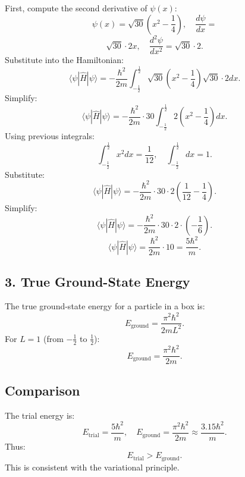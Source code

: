 \documentclass[a4paper,12pt]{article}
\begin{document}
\begin{multicols}{2}
First, compute the second derivative of \( \psi(x) \):
\[
\psi(x) = \sqrt{30} \left(x^2 - \frac{1}{4}\right), \quad \frac{d\psi}{dx} = 
\]
\[
\sqrt{30} \cdot 2x, \quad \frac{d^2 \psi}{dx^2} = \sqrt{30} \cdot 2.
\]
Substitute into the Hamiltonian:
\[
\langle \psi | \hat{H} | \psi \rangle = -\frac{\hbar^2}{2m} \int_{-\frac{1}{2}}^{\frac{1}{2}} \sqrt{30} \left(x^2 - \frac{1}{4}\right) \sqrt{30} \cdot 2 dx.
\]
Simplify:
\[
\langle \psi | \hat{H} | \psi \rangle = -\frac{\hbar^2}{2m} \cdot 30 \int_{-\frac{1}{2}}^{\frac{1}{2}} 2\left(x^2 - \frac{1}{4}\right) dx.
\]
Using previous integrals:
\[
\int_{-\frac{1}{2}}^{\frac{1}{2}} x^2 dx = \frac{1}{12}, \quad \int_{-\frac{1}{2}}^{\frac{1}{2}} dx = 1.
\]
Substitute:
\[
\langle \psi | \hat{H} | \psi \rangle = -\frac{\hbar^2}{2m} \cdot 30 \cdot 2 \left(\frac{1}{12} - \frac{1}{4}\right).
\]
Simplify:
\[
\langle \psi | \hat{H} | \psi \rangle = -\frac{\hbar^2}{2m} \cdot 30 \cdot 2 \cdot \left(-\frac{1}{6}\right).
\]
\[
\langle \psi | \hat{H} | \psi \rangle = \frac{\hbar^2}{2m} \cdot 10 = \frac{5\hbar^2}{m}.
\]

\subsection*{3. True Ground-State Energy}
The true ground-state energy for a particle in a box is:
\[
E_{\text{ground}} = \frac{\pi^2 \hbar^2}{2mL^2}.
\]
For \( L = 1 \) (from \(-\frac{1}{2}\) to \(\frac{1}{2}\)):
\[
E_{\text{ground}} = \frac{\pi^2 \hbar^2}{2m}.
\]

\subsection*{Comparison}
The trial energy is:
\[
E_{\text{trial}} = \frac{5\hbar^2}{m}, \quad E_{\text{ground}} = \frac{\pi^2 \hbar^2}{2m} \approx \frac{3.15 \hbar^2}{m}.
\]
Thus:
\[
E_{\text{trial}} > E_{\text{ground}}.
\]
This is consistent with the variational principle.

\end{multicols}
\end{document}
